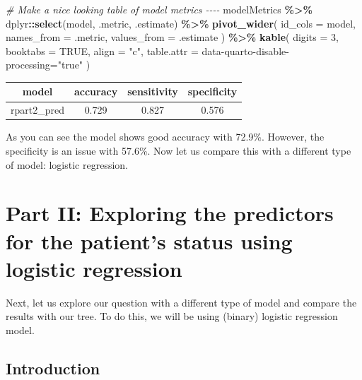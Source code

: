 \documentclass[
]{article}
\newenvironment{Shaded}{\begin{snugshade}}{\end{snugshade}}
\newcommand{\AttributeTok}[1]{\textcolor[rgb]{0.13,0.29,0.53}{#1}}
\newcommand{\CommentTok}[1]{\textcolor[rgb]{0.56,0.35,0.01}{\textit{#1}}}
\newcommand{\ConstantTok}[1]{\textcolor[rgb]{0.56,0.35,0.01}{#1}}
\newcommand{\DecValTok}[1]{\textcolor[rgb]{0.00,0.00,0.81}{#1}}
\newcommand{\FunctionTok}[1]{\textcolor[rgb]{0.13,0.29,0.53}{\textbf{#1}}}
\newcommand{\NormalTok}[1]{#1}
\newcommand{\SpecialCharTok}[1]{\textcolor[rgb]{0.81,0.36,0.00}{\textbf{#1}}}
\newcommand{\StringTok}[1]{\textcolor[rgb]{0.31,0.60,0.02}{#1}}
\begin{document}
\begin{Shaded}
\begin{Highlighting}[]
\CommentTok{\# Make a nice looking table of model metrics {-}{-}{-}{-}}
\NormalTok{modelMetrics }\SpecialCharTok{\%\textgreater{}\%}
\NormalTok{  dplyr}\SpecialCharTok{::}\FunctionTok{select}\NormalTok{(model, .metric, .estimate) }\SpecialCharTok{\%\textgreater{}\%}
  \FunctionTok{pivot\_wider}\NormalTok{(}
    \AttributeTok{id\_cols =}\NormalTok{ model,}
    \AttributeTok{names\_from =}\NormalTok{ .metric,}
    \AttributeTok{values\_from =}\NormalTok{ .estimate}
\NormalTok{  ) }\SpecialCharTok{\%\textgreater{}\%}
  \FunctionTok{kable}\NormalTok{(}
    \AttributeTok{digits =} \DecValTok{3}\NormalTok{,}
    \AttributeTok{booktabs =} \ConstantTok{TRUE}\NormalTok{,}
    \AttributeTok{align =} \StringTok{"c"}\NormalTok{,}
    \AttributeTok{table.attr =} \StringTok{\textquotesingle{}data{-}quarto{-}disable{-}processing="true"\textquotesingle{}}
\NormalTok{  )}
\end{Highlighting}
\end{Shaded}

\begin{tabular}{cccc}
\toprule
model & accuracy & sensitivity & specificity\\
\midrule
rpart2\_pred & 0.729 & 0.827 & 0.576\\
\bottomrule
\end{tabular}

As you can see the model shows good accuracy with 72.9\%. However, the
specificity is an issue with 57.6\%. Now let us compare this with a
different type of model: logistic regression.

\hypertarget{part-ii-exploring-the-predictors-for-the-patients-status-using-logistic-regression}{%
\section{Part II: Exploring the predictors for the patient's status
using logistic
regression}\label{part-ii-exploring-the-predictors-for-the-patients-status-using-logistic-regression}}

Next, let us explore our question with a different type of model and
compare the results with our tree. To do this, we will be using (binary)
logistic regression model.

\hypertarget{introduction-1}{%
\subsection{Introduction}\label{introduction-1}}
\end{document}
